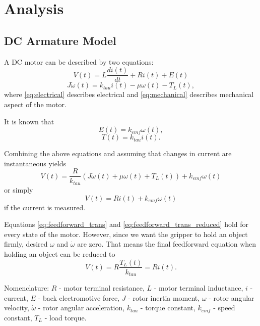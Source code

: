 \section{Analysis}
\subsection{DC Armature Model}
A DC motor can be described by two equations:
\begin{equation}
\label{eq:electrical}
	V(t) = L \frac{di(t)}{dt} + Ri(t) + E(t)
\end{equation}
\begin{equation}
\label{eq:mechanical}
	J \dot{\omega}(t) = k_{tau} i(t) - \mu \omega(t) - T_{L}(t),
\end{equation}
where \ref{eq:electrical} describes electrical and \ref{eq:mechanical} describes mechanical aspect of the motor.

It is known that
\begin{equation}
\label{eq:back_emf}
	E(t) = k_{emf} \omega(t),
\end{equation}
\begin{equation}
\label{eq:curr_force}
	T(t) = k_{tau} i(t).
\end{equation}

Combining the above equations and assuming that changes in current are instantaneous yields
\begin{equation}
\label{eq:feedforward_trans}
	V(t) = \frac{R}{k_{tau}} (J \dot{\omega}(t) + \mu \omega(t) + T_{L}(t) ) + k_{emf} \omega(t)
\end{equation}
or simply
\begin{equation}
\label{eq:feedforward_trans_reduced}
	V(t) = Ri(t) + k_{emf} \omega(t)
\end{equation}
if the current is measured. 

Equations \ref{eq:feedforward_trans} and \ref{eq:feedforward_trans_reduced} hold for every state of the motor. However, since we want the gripper to hold an object firmly, desired $\omega$ and $\dot{\omega}$ are zero. That means the final feedforward equation when holding an object can be reduced to
\begin{equation}
\label{eq:feedforward_reduced}
	V(t) = R \frac{T_{L}(t)}{k_{tau}} = R i(t).
\end{equation}

Nomenclature:
$R$ - motor terminal resistance,
$L$ - motor terminal inductance,
$i$ - current,
$E$ - back electromotive force,
$J$ - rotor inertia moment,
$\omega$ - rotor angular velocity,
$\dot{\omega}$ - rotor angular acceleration,
$k_{tau}$ - torque constant,
$k_{emf}$ - speed constant,
$T_{L}$ - load torque. 